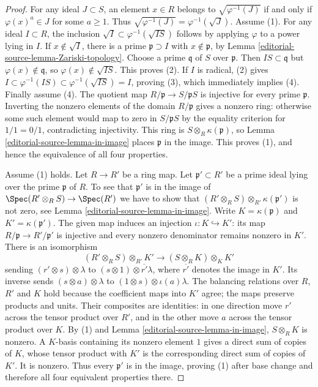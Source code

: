 \begin{proof}
For any ideal $J\subset S$, an element $x\in R$ belongs to
$\sqrt{\varphi^{-1}(J)}$ if and only if
$\varphi(x)^a\in J$ for some $a\geq1$. Thus
$\sqrt{\varphi^{-1}(J)}=\varphi^{-1}(\sqrt J)$.
Assume (1). For any ideal $I\subset R$, the inclusion
$\sqrt I\subset\varphi^{-1}(\sqrt{IS})$ follows by applying
$\varphi$ to a power lying in $I$. If $x\notin\sqrt I$, there is
a prime $\mathfrak p\supset I$ with $x\notin\mathfrak p$, by
Lemma \ref{editorial-source-lemma-Zariski-topology}. Choose a prime $\mathfrak q$
of $S$ over $\mathfrak p$. Then $IS\subset\mathfrak q$ but
$\varphi(x)\notin\mathfrak q$, so $\varphi(x)\notin\sqrt{IS}$.
This proves (2). If $I$ is radical, (2) gives
$I\subset\varphi^{-1}(IS)\subset\varphi^{-1}(\sqrt{IS})=I$,
proving (3), which immediately implies (4).
Finally assume (4). The quotient map $R/\mathfrak p\to S/\mathfrak pS$
is injective for every prime $\mathfrak p$. Inverting the nonzero
elements of the domain $R/\mathfrak p$ gives a nonzero ring:
otherwise some such element would map to zero in $S/\mathfrak pS$
by the equality criterion for $1/1=0/1$, contradicting injectivity.
This ring is $S\otimes_R\kappa(\mathfrak p)$, so
Lemma \ref{editorial-source-lemma-in-image} places $\mathfrak p$ in the image.
This proves (1), and hence the equivalence of all four properties.

\medskip\noindent
Assume (1) holds. Let $R \to R'$ be a ring map. Let
$\mathfrak p' \subset R'$ be a prime ideal lying over the prime
$\mathfrak p$ of $R$. To see that $\mathfrak p'$ is in the image
of $\Spec(R' \otimes_R S) \to \Spec(R')$ we have to show
that $(R' \otimes_R S) \otimes_{R'} \kappa(\mathfrak p')$ is not zero, see
Lemma \ref{editorial-source-lemma-in-image}.
Write $K=\kappa(\mathfrak p)$ and $K'=\kappa(\mathfrak p')$.
The given map induces an injection $\iota:K\hookrightarrow K'$:
its map $R/\mathfrak p\to R'/\mathfrak p'$ is injective and every
nonzero denominator remains nonzero in $K'$. There is an isomorphism
$$
(R'\otimes_RS)\otimes_{R'}K'
\longrightarrow (S\otimes_RK)\otimes_KK'
$$
sending $(r'\otimes s)\otimes\lambda$ to
$(s\otimes1)\otimes\overline{r'}\lambda$, where
$\overline{r'}$ denotes the image in $K'$.
Its inverse sends $(s\otimes a)\otimes\lambda$ to
$(1\otimes s)\otimes\iota(a)\lambda$.
The balancing relations over $R$, $R'$ and $K$ hold because the
coefficient maps into $K'$ agree; the maps preserve products and
units. Their composites are identities: in one direction move
$r'$ across the tensor product over $R'$, and in the other move
$a$ across the tensor product over $K$.
By (1) and Lemma \ref{editorial-source-lemma-in-image}, $S\otimes_RK$ is nonzero.
A $K$-basis containing its nonzero element $1$ gives a direct sum
of copies of $K$, whose tensor product with $K'$ is the corresponding
direct sum of copies of $K'$. It is nonzero. Thus every
$\mathfrak p'$ is in the image, proving (1) after base change and
therefore all four equivalent properties there.
\end{proof}